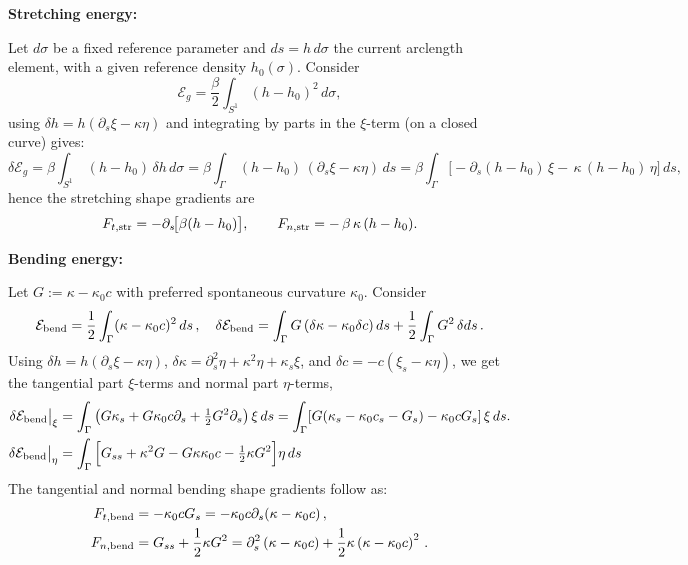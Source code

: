 \documentclass[
aip,
jcp,
reprint, 
floatfix
]{revtex4-1}
\begin{document}
{\bf Stretching energy:}

Let $d\sigma$ be a fixed reference parameter and $ds=h\,d\sigma$ the current arclength element, with a given reference density $h_0(\sigma)$.
Consider
\begin{equation}
    \mathcal{E}_g=\frac{\beta}{2}\int_{S^1}(h-h_0)^2\,d\sigma,
\end{equation}
using $\delta h = h(\partial_s\xi-\kappa\eta)$ and integrating by parts in the $\xi$-term (on a closed curve) gives:
\begin{equation}
    \delta \mathcal{E}_g
= \beta\int_{S^1}\,(h-h_0)\,\delta h\,d\sigma
= \beta\int_\Gamma \,(h-h_0)\,(\partial_s\xi-\kappa\eta)\,ds
= \beta\int_\Gamma \Big[-\partial_s\!(h-h_0)\,\xi
-\,\kappa\,(h-h_0)\,\eta\Big]\,ds,
\end{equation}
hence the stretching shape gradients are
\begin{equation}
F_{t, \rm str}=-\partial_s\!\big[\beta(h-h_0)\big],
\qquad
F_{n, \rm str}=-\,\beta\,\kappa\,(h-h_0).
\label{eq:stretch_gradients}
\end{equation}

{\bf Bending energy:}

Let $G:=\kappa-\kappa_0c$ with preferred spontaneous curvature $\kappa_0$. Consider
\begin{equation}
    \mathcal{E}_{\rm bend}=\frac{1}{2}\int_\Gamma (\kappa-\kappa_0c)^2\,ds\,, \quad \delta \mathcal{E}_{\rm bend} =\int_\Gamma G\,(\delta\kappa-\kappa_0\delta c)\,ds+\frac{1}{2}\int_\Gamma G^2\,\delta ds\,.
\end{equation}
Using $\delta h=h(\partial_s\xi-\kappa\eta)$, $\delta\kappa=\partial_s^2\eta+\kappa^2\eta+\kappa_s\xi$, and $\delta c=-c\left(\xi_s-\kappa \eta\right)$, we get the tangential part $\xi$-terms and normal part $\eta$-terms,
\begin{equation}
\begin{aligned}
    \delta\mathcal{E}_{\rm bend}\big|_{\xi} &= \int_\Gamma \big(G\kappa_s+G\kappa_0 c \partial_s+\tfrac{1}{2}G^2\partial_s\big)\,\xi\,ds
=\int_\Gamma [G(\kappa_s-\kappa_0c_s-G_s)-\kappa_0 c G_s]\,\xi\,ds.\\
\delta\mathcal{E}_{\rm bend}\big|_{\eta} &= \int_\Gamma \Big[G_{ss}+\kappa^2G-G\kappa \kappa_0 c-\tfrac{1}{2}\kappa G^2\Big]\eta\,ds
\end{aligned}
\end{equation}
The tangential and normal bending shape gradients follow as:
\begin{equation}\label{eq: bend_gradient}
    \begin{aligned}
        F_{t, \rm bend}&=-\kappa_0 c G_s =-\kappa_0 c \partial_s(\kappa-\kappa_0c)\,,\\
        F_{n, \rm bend}&=G_{s s}+\frac{1}{2} \kappa G^2
=\partial_s^2\left(\kappa-\kappa_0 c\right)+\frac{1}{2} \kappa\left(\kappa-\kappa_0 c\right)^2\,.
    \end{aligned}
\end{equation}
\end{document}
